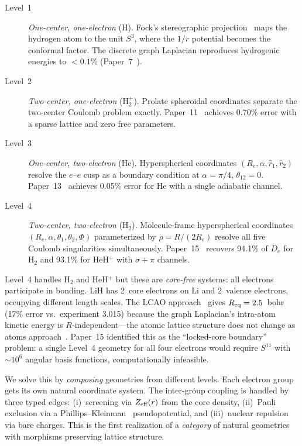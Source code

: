 \documentclass[aps,pra,twocolumn,superscriptaddress,longbibliography,floatfix]{revtex4-2}
\begin{document}
\begin{description}
\item[Level~1] \emph{One-center, one-electron} (H).
  Fock's stereographic projection~\cite{fock1935} maps the hydrogen atom
  to the unit $S^3$, where the $1/r$ potential becomes the conformal
  factor.  The discrete graph Laplacian reproduces hydrogenic energies
  to $< 0.1\%$ (Paper~7~\cite{paper7}).

\item[Level~2] \emph{Two-center, one-electron} (H$_2^+$).
  Prolate spheroidal coordinates separate the two-center Coulomb problem
  exactly.  Paper~11~\cite{paper11} achieves 0.70\% error with a sparse
  lattice and zero free parameters.

\item[Level~3] \emph{One-center, two-electron} (He).
  Hyperspherical coordinates $(R_e, \alpha, \hat{r}_1, \hat{r}_2)$
  resolve the $e$--$e$ cusp as a boundary condition at $\alpha=\pi/4$,
  $\theta_{12}=0$.  Paper~13~\cite{paper13} achieves 0.05\% error for
  He with a single adiabatic channel.

\item[Level~4] \emph{Two-center, two-electron} (H$_2$).
  Molecule-frame hyperspherical coordinates
  $(R_e, \alpha, \theta_1, \theta_2, \Phi)$ parameterized by
  $\rho = R/(2R_e)$ resolve all five Coulomb singularities simultaneously.
  Paper~15~\cite{paper15} recovers 94.1\% of $D_e$ for H$_2$ and
  93.1\% for HeH$^+$ with $\sigma{+}\pi$ channels.
\end{description}

Level~4 handles H$_2$ and HeH$^+$ but these are \emph{core-free}
systems: all electrons participate in bonding.  LiH has 2~core
electrons on Li and 2~valence electrons, occupying different length
scales.  The LCAO approach~\cite{fci_m} gives $R_{\rm eq} = 2.5$~bohr
(17\% error vs.\ experiment 3.015) because the graph Laplacian's
intra-atom kinetic energy is $R$-independent---the atomic lattice
structure does not change as atoms approach~\cite{fci_m}.
Paper~15 identified this as the ``locked-core boundary'' problem:
a single Level~4 geometry for all four electrons would require $S^{11}$
with ${\sim}10^6$ angular basis functions, computationally infeasible.

We solve this by \emph{composing} geometries from different levels.
Each electron group gets its own natural coordinate system.
The inter-group coupling is handled by three typed edges:
(i)~screening via $Z_{\rm eff}(r)$ from the core density,
(ii)~Pauli exclusion via a Phillips--Kleinman~\cite{pk1959}
pseudopotential, and
(iii)~nuclear repulsion via bare charges.
This is the first realization of a \emph{category} of natural
geometries with morphisms preserving lattice structure.
\end{document}
